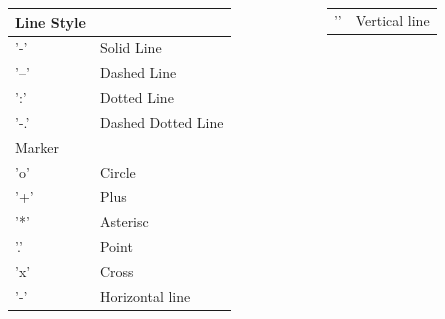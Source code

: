 \documentclass[xcolor={dvipsnames,rgb}, aspectratio=169]{beamer}
\begin{document}
\begin{frame}{}
    \begin{columns}[t]
        \begin{column}{0.5\textwidth}
            \begin{table}
                \centering
                \begin{tabular}{l|l}
                    \hline
                    \multicolumn{1}{l}{Line Style} &                    \\
                    \hline
                    '-'                            & Solid Line         \\
                    \hline
                    '--'                           & Dashed Line        \\
                    \hline
                    ':'                            & Dotted Line        \\
                    \hline
                    '-.'                           & Dashed Dotted Line \\
                    \hline\hline
                    \multicolumn{1}{l}{Marker}     &                    \\
                    \hline\hline
                    'o'                            & Circle             \\
                    \hline
                    '+'                            & Plus               \\
                    \hline
                    '*'                            & Asterisc           \\
                    \hline
                    '.'                            & Point              \\
                    \hline
                    'x'                            & Cross              \\
                    \hline
                    '-'                            & Horizontal line    \\
                    \hline
                \end{tabular}
            \end{table}
        \end{column}
        \begin{column}{0.5\textwidth}
            \begin{table}
                \centering
                \begin{tabular}{l|l}
                    \hline
                    '\textbar{}' & Vertical line              \\

\end{tabular}
\end{table}
\end{column}
\end{columns}
\end{frame}
\end{document}
